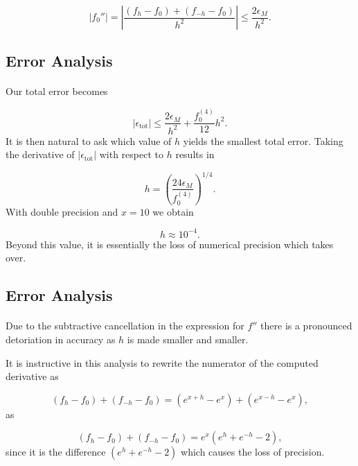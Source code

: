 \documentclass[%
oneside,                 %
final,                   %
10pt]{article}
\begin{document}
\[
 \left|f_0''\right|=
 \left|\frac{ (f_h -f_0) +(f_{-h}-f_0)}{h^2}\right|\le \frac{ 2 \epsilon_M}{h^2}.
\]



\subsection*{Error Analysis}


\paragraph{}
Our total error becomes

\[
   \left|\epsilon_{\mbox{tot}}\right|\le  \frac{2 \epsilon_M}{h^2} +
                          \frac{f_0^{(4)}}{12}h^{2}.
    \label{eq:experror}
\]
It is then natural to ask which value of $h$ yields the smallest
total error. Taking the derivative of $\left|\epsilon_{\mbox{tot}}\right|$
with respect to $h$ results in

\[
   h= \left(\frac{ 24\epsilon_M}{f_0^{(4)}}\right)^{1/4}.
\]
With double precision and $x=10$ we obtain

\[
   h\approx 10^{-4}.
\]
Beyond this value, it is essentially the loss of numerical precision
which takes over.



\subsection*{Error Analysis}


\paragraph{}
Due to the subtractive cancellation in the expression
for $f''$ there is a pronounced detoriation in accuracy as $h$ is made smaller
and smaller.

It is instructive in this analysis to rewrite the numerator of
the computed derivative as

\[
   (f_h -f_0) +(f_{-h}-f_0)=(e^{x+h}-e^{x}) + (e^{x-h}-e^{x}),
\]
as

\[
   (f_h -f_0) +(f_{-h}-f_0)=e^x(e^{h}+e^{-h}-2),
\]
since it is the difference $(e^{h}+e^{-h}-2)$ which causes
the loss of precision.



\end{document}
